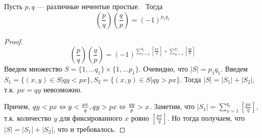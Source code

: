 \begin{theorem}
    Пусть \(p, q\) --- различные нечентые простые.  Тогда
    \[\left(\frac{p}{q}\right)\left(\frac{q}{p}\right) = (-1)^{p_1q_1}\]
\end{theorem}
\begin{proof}
    \[\left(\frac{p}{q}\right)\left(\frac{q}{p}\right) = (-1)^{\sum_{x = 1}^{q_1}\left[\frac{px}{q}\right] + \sum_{y = 1}^{p_1}\left[\frac{qy}{p}\right]} \]
    Введем множество \(S = \{1, \dots q_1\} \times \{1, \dots p_1\}\). Очевидно, что \(|S| = p_1q_1\). Введем \(S_1 = \{(x, y) \in S | qy < px\}, S_2 = \{(x, y) \in S | qy > px\}\). Тогда \(|S| = |S_1| + |S_2|\), т.к. \(px = qy\) невозможно.

    Причем, \(qy < px \Leftrightarrow y < \frac{px}{q}, qy > px \Leftrightarrow \frac{qy}{p} > x\). Заметим, что \(|S_1| = \sum_{x = 1}^{q_1}\left[\frac{px}{q}\right]\), т.к. количество \(y\) для фиксированного \(x\) ровно \(\left[\frac{px}{q}\right]\). Но тогда получаем, что \(|S| = |S_1| + |S_2|\), что и требовалось.
\end{proof}